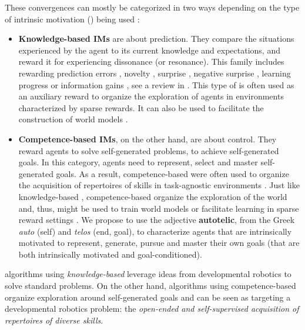 These convergences can mostly be categorized in two ways depending on the type of intrinsic motivation (\ims) being used \citep{oudeyer2007intrinsic}:
\begin{itemize}
    \item
    \textbf{Knowledge-based IMs} are about prediction. They compare the situations experienced by the agent to its current knowledge and expectations, and reward it for experiencing dissonance (or resonance). This family includes \ims rewarding prediction errors \citep{schmidhuber1991possibility,pathak2017curiosity}, novelty \citep{bellemare2016unifying,burda2018exploration,raileanu2020ride}, surprise \citep{achiam2017surprise}, negative surprise \citep{berseth2019smirl}, learning progress \citep{lopes2012exploration,kim2020active} or information gains \citep{houthooft2016vime}, see a review in \citep{linke2019adapting}. This type of \im is often used as an auxiliary reward to organize the exploration of agents in environments characterized by sparse rewards. It can also be used to facilitate the construction of world models \citep{lopes2012exploration,kim2020active,sekar2020planning}.
    \item
    \textbf{Competence-based IMs}, on the other hand, are about control. They reward agents to solve self-generated problems, to achieve self-generated goals. In this category, agents need to represent, select and master self-generated goals. As a result, competence-based \ims were often used to organize the acquisition of repertoires of skills in task-agnostic environments \citep{baranes2010intrinsically,baranes2013active,santucci2016grail,forestier2016modular,nair2018visual,warde2018unsupervised,curious,blaes2019control,pong2019skew,imagine}. Just like knowledge-based \ims, competence-based \ims organize the exploration of the world and, thus, might be used to train world models \citep{baranes2013active,chitnis2020glib} or facilitate learning in sparse reward settings \citep{geppg}. We propose to use the adjective \textbf{autotelic}, from the Greek \textit{auto} (self) and \textit{telos} (end, goal), to characterize agents that are intrinsically motivated to represent, generate, pursue and master their own goals (\ie that are both intrinsically motivated and goal-conditioned).
\end{itemize}

\rl algorithms using \textit{knowledge-based} \ims leverage ideas from developmental robotics to solve standard \rl problems. On the other hand, \rl algorithms using competence-based \ims organize exploration around self-generated goals and can be seen as targeting a developmental robotics problem: the \textit{open-ended and self-supervised acquisition of repertoires of diverse skills}. 
 
